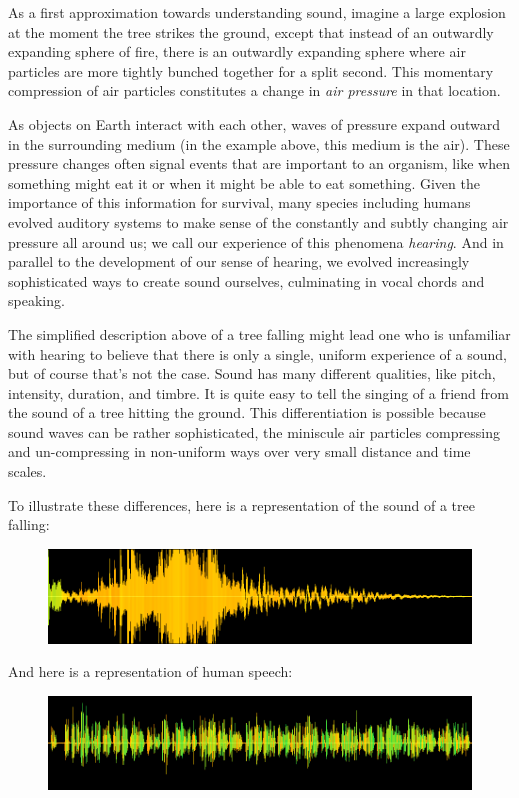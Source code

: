 \documentclass[UTF8]{book}
\begin{document}
\begin{CJK}{UTF8}{gbsn}
As a first approximation towards understanding sound, imagine a large explosion at the moment the tree strikes the ground, except that instead of an outwardly expanding sphere of fire, there is an outwardly expanding sphere where air particles are more tightly bunched together for a split second. This momentary compression of air particles constitutes a change in \emph{air pressure} in that location.

As objects on Earth interact with each other, waves of pressure expand outward in the surrounding medium (in the example above, this medium is the air). These pressure changes often signal events that are important to an organism, like when something might eat it or when it might be able to eat something. Given the importance of this information for survival, many species including humans evolved auditory systems to make sense of the constantly and subtly changing air pressure all around us; we call our experience of this phenomena \emph{hearing}. And in parallel to the development of our sense of hearing, we evolved increasingly sophisticated ways to create sound ourselves, culminating in vocal chords and speaking.

The simplified description above of a tree falling might lead one who is unfamiliar with hearing to believe that there is only a single, uniform experience of a sound, but of course that's not the case. Sound has many different qualities, like pitch, intensity, duration, and timbre. It is quite easy to tell the singing of a friend from the sound of a tree hitting the ground. This differentiation is possible because sound waves can be rather sophisticated, the miniscule air particles compressing and un-compressing in non-uniform ways over very small distance and time scales.

To illustrate these differences, here is a representation of the sound of a tree falling:

\begin{figure}[H]
\centering
\includegraphics[width=0.8\linewidth]{tree_falling_soundwave}
\end{figure}

And here is a representation of human speech:

\begin{figure}[H]
\centering
\includegraphics[width=0.8\linewidth]{shakespeare_speech}
\end{figure}


\end{CJK}
\end{document}
